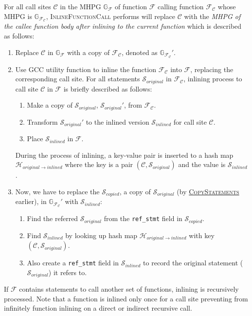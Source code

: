\label{l:InlineFunctionCall}
For all call sites $\mathcal{C}$ in the MHPG $\mathbb{G}_\mathcal{F}$ of function $\mathcal{F}$ calling function $\mathcal{F}_\mathcal{C}$ whose MHPG is $\mathbb{G}_{\mathcal{F}_\mathcal{C}}$, \textsc{InlineFunctionCall} performs will replace $\mathcal{C}$ with the \textit{MHPG of the callee function body after inlining to the current function} which is described as follows:
\begin{enumerate}
	\item Replace $\mathcal{C}$ in $\mathbb{G}_\mathcal{F}$ with a copy of $\mathcal{F}_\mathcal{C}$, denoted as $\mathbb{G}_{\mathcal{F}_\mathcal{C}}'$.
	\item Use GCC utility function to inline the function $\mathcal{F}_\mathcal{C}$ into $\mathcal{F}$, replacing the corresponding call site. For all statements $\mathcal{S}_{original}$ in $\mathcal{F}_\mathcal{C}$, inlining process to call site $\mathcal{C}$ in $\mathcal{F}$ is briefly described as follows:
	\begin{enumerate}[label=(\roman{*})]
		\item Make a copy of $\mathcal{S}_{original}$, $\mathcal{S}_{original}'$, from $\mathcal{F}_\mathcal{C}$.
		\item Transform $\mathcal{S}_{original}'$ to the inlined version $\mathcal{S}_{inlined}$ for call site $\mathcal{C}$.
		\item Place $\mathcal{S}_{inlined}$ in $\mathcal{F}$.
	\end{enumerate}
	 During the process of inlining, a key-value pair is inserted to a hash map $\mathcal{H}_{original \rightarrow inlined}$ where the key is a pair $(\mathcal{C}, \mathcal{S}_{original})$ and the value is $\mathcal{S}_{inlined}$.
	\item Now, we have to replace the $\mathcal{S}_{copied}$, a copy of $\mathcal{S}_{original}$ (by \hyperref[l:CopyStatements]{\textsc{CopyStatements}} earlier), in $\mathbb{G}_{\mathcal{F}_\mathcal{C}}'$ with $\mathcal{S}_{inlined}$:
	\begin{enumerate}[label=(\roman{*})]
		\item Find the referred $\mathcal{S}_{original}$ from the \verb|ref_stmt| field in $\mathcal{S}_{copied}$.
		\item Find $\mathcal{S}_{inlined}$ by looking up hash map $\mathcal{H}_{original \rightarrow inlined}$ with key $(\mathcal{C}, \mathcal{S}_{original})$.
		\item Also create a \verb|ref_stmt| field in $\mathcal{S}_{inlined}$ to record the original statement (\ie $\mathcal{S}_{original}$) it  refers to.
	\end{enumerate}
\end{enumerate}
If $\mathcal{F}$ contains statements to call another set of functions, inlining is recursively processed. Note that a function is inlined only once for a call site preventing from infinitely function inlining on a direct or indirect recursive call.

